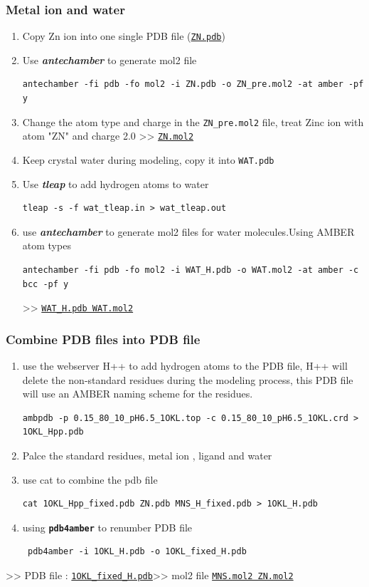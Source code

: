 \documentclass[hyperref={breaklinks,colorlinks}]{beamer}
\begin{document}
\begin{frame}[fragile]
  \frametitle{Metal ion and water}

  \begin{enumerate}
  \item Copy Zn ion into one single PDB file
    (\underline{\texttt{ZN.pdb}})
  \item Use \textbf{\textit{antechamber}} to generate mol2 file
\begin{lstlisting}
antechamber -fi pdb -fo mol2 -i ZN.pdb -o ZN_pre.mol2 -at amber -pf y 
\end{lstlisting}
  \item Change the atom type and charge in the \texttt{ZN\_pre.mol2}
    file, treat Zinc ion with atom "ZN" and charge 2.0 >>
    \texttt{\underline{ZN.mol2}}
  \item Keep crystal water during modeling, copy it into
    \texttt{WAT.pdb}
  \item Use \textit{\textbf{tleap} }to add hydrogen atoms to water
\begin{lstlisting}
tleap -s -f wat_tleap.in > wat_tleap.out 
\end{lstlisting}
  \item use \textit{\textbf{antechamber}} to generate mol2 files for
    water molecules.Using AMBER atom types
\begin{lstlisting}
antechamber -fi pdb -fo mol2 -i WAT_H.pdb -o WAT.mol2 -at amber -c bcc -pf y 
\end{lstlisting}
    >> \underline{\texttt{WAT\_H.pdb WAT.mol2}}
  \end{enumerate}
\end{frame}
\begin{frame}[fragile]
  \frametitle{Combine PDB files into PDB file}
  \begin{enumerate}
    \item use the webserver H++ to add hydrogen atoms to the PDB file,
      H++ will delete the non-standard residues during the modeling
      process, this PDB file will use an AMBER naming scheme for the
      residues.
\begin{lstlisting}
ambpdb -p 0.15_80_10_pH6.5_1OKL.top -c 0.15_80_10_pH6.5_1OKL.crd > 1OKL_Hpp.pdb
\end{lstlisting}
  \item Palce the standard residues, metal ion , ligand and water
  \item use cat to combine the pdb file
\begin{lstlisting}
cat 1OKL_Hpp_fixed.pdb ZN.pdb MNS_H_fixed.pdb > 1OKL_H.pdb
\end{lstlisting}
  \item using \texttt{\textbf{pdb4amber}} to renumber PDB file
\begin{lstlisting}
 pdb4amber -i 1OKL_H.pdb -o 1OKL_fixed_H.pdb
\end{lstlisting}
  \end{enumerate}
  >> PDB file : \texttt{\underline{1OKL\_fixed\_H.pdb}}\newline >>
  mol2 file \texttt{\underline{MNS.mol2 ZN.mol2}}
\end{frame}
\end{document}
